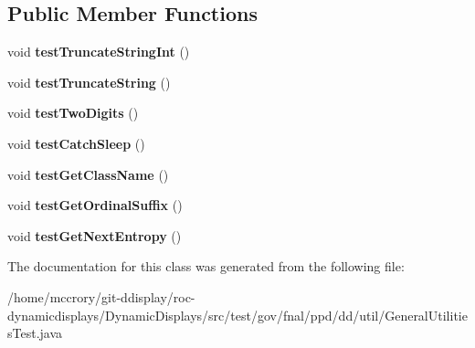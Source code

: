 \subsection*{Public Member Functions}
\begin{DoxyCompactItemize}
\item 
\hypertarget{classtest_1_1gov_1_1fnal_1_1ppd_1_1dd_1_1util_1_1GeneralUtilitiesTest_a2a569dd4b558b52e05a9a601723c89ab}{void {\bfseries test\-Truncate\-String\-Int} ()}\label{classtest_1_1gov_1_1fnal_1_1ppd_1_1dd_1_1util_1_1GeneralUtilitiesTest_a2a569dd4b558b52e05a9a601723c89ab}

\item 
\hypertarget{classtest_1_1gov_1_1fnal_1_1ppd_1_1dd_1_1util_1_1GeneralUtilitiesTest_a18e32629566528e522ed8cff26d71868}{void {\bfseries test\-Truncate\-String} ()}\label{classtest_1_1gov_1_1fnal_1_1ppd_1_1dd_1_1util_1_1GeneralUtilitiesTest_a18e32629566528e522ed8cff26d71868}

\item 
\hypertarget{classtest_1_1gov_1_1fnal_1_1ppd_1_1dd_1_1util_1_1GeneralUtilitiesTest_a00c7b74012967f81451b2f0a7f7add98}{void {\bfseries test\-Two\-Digits} ()}\label{classtest_1_1gov_1_1fnal_1_1ppd_1_1dd_1_1util_1_1GeneralUtilitiesTest_a00c7b74012967f81451b2f0a7f7add98}

\item 
\hypertarget{classtest_1_1gov_1_1fnal_1_1ppd_1_1dd_1_1util_1_1GeneralUtilitiesTest_ae2062967e8e894603710ffc318b67d77}{void {\bfseries test\-Catch\-Sleep} ()}\label{classtest_1_1gov_1_1fnal_1_1ppd_1_1dd_1_1util_1_1GeneralUtilitiesTest_ae2062967e8e894603710ffc318b67d77}

\item 
\hypertarget{classtest_1_1gov_1_1fnal_1_1ppd_1_1dd_1_1util_1_1GeneralUtilitiesTest_a0a93846509e9a8c51d5f557c686777cf}{void {\bfseries test\-Get\-Class\-Name} ()}\label{classtest_1_1gov_1_1fnal_1_1ppd_1_1dd_1_1util_1_1GeneralUtilitiesTest_a0a93846509e9a8c51d5f557c686777cf}

\item 
\hypertarget{classtest_1_1gov_1_1fnal_1_1ppd_1_1dd_1_1util_1_1GeneralUtilitiesTest_a23f44e50d284c5bd8eb67a8eabe210c6}{void {\bfseries test\-Get\-Ordinal\-Suffix} ()}\label{classtest_1_1gov_1_1fnal_1_1ppd_1_1dd_1_1util_1_1GeneralUtilitiesTest_a23f44e50d284c5bd8eb67a8eabe210c6}

\item 
\hypertarget{classtest_1_1gov_1_1fnal_1_1ppd_1_1dd_1_1util_1_1GeneralUtilitiesTest_a046b1a0f43d4b898dceb0c4e85010f58}{void {\bfseries test\-Get\-Next\-Entropy} ()}\label{classtest_1_1gov_1_1fnal_1_1ppd_1_1dd_1_1util_1_1GeneralUtilitiesTest_a046b1a0f43d4b898dceb0c4e85010f58}

\end{DoxyCompactItemize}


The documentation for this class was generated from the following file\-:\begin{DoxyCompactItemize}
\item 
/home/mccrory/git-\/ddisplay/roc-\/dynamicdisplays/\-Dynamic\-Displays/src/test/gov/fnal/ppd/dd/util/General\-Utilities\-Test.\-java\end{DoxyCompactItemize}
